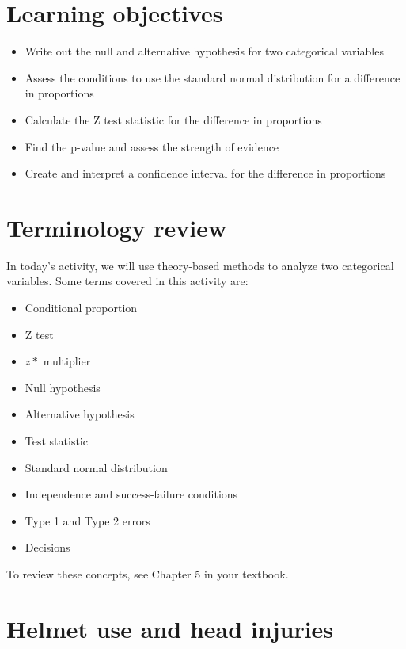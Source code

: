\documentclass[
]{report}
\begin{document}
\hypertarget{learning-objectives}{%
\section{Learning objectives}\label{learning-objectives}}

\begin{itemize}
\item
  Write out the null and alternative hypothesis for two categorical variables
\item
  Assess the conditions to use the standard normal distribution for a difference in proportions
\item
  Calculate the Z test statistic for the difference in proportions
\item
  Find the p-value and assess the strength of evidence
\item
  Create and interpret a confidence interval for the difference in proportions
\end{itemize}

\hypertarget{terminology-review}{%
\section{Terminology review}\label{terminology-review}}

In today's activity, we will use theory-based methods to analyze two categorical variables. Some terms covered in this activity are:

\begin{itemize}
\item
  Conditional proportion
\item
  Z test
\item
  \(z*\) multiplier
\item
  Null hypothesis
\item
  Alternative hypothesis
\item
  Test statistic
\item
  Standard normal distribution
\item
  Independence and success-failure conditions
\item
  Type 1 and Type 2 errors
\item
  Decisions
\end{itemize}

To review these concepts, see Chapter 5 in your textbook.

\newpage

\hypertarget{helmet-use-and-head-injuries}{%
\section{Helmet use and head injuries}\label{helmet-use-and-head-injuries}}
\end{document}
